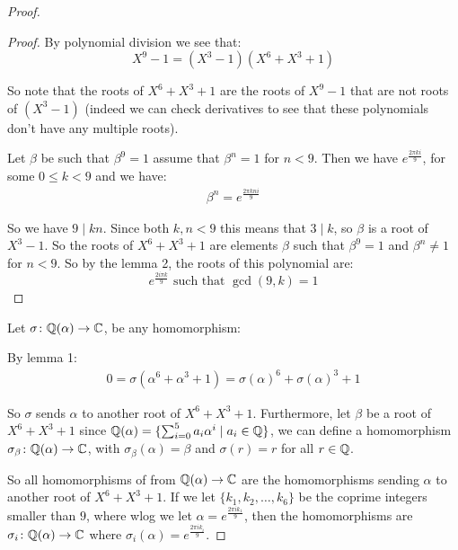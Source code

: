 \begin{exercise}
\begin{proof}
\begin{lemma}
        \begin{proof}
            By polynomial division we see that:\begin{equation}
                X^9 - 1 = (X^3-1)(X^6+X^3+1)
            \end{equation}
            
            So note that the roots of $X^6+X^3+1$ are the roots of $X^9-1$ that are not roots of $(X^3-1)$ (indeed we can check derivatives to see that these polynomials don't have any multiple roots).
            
            Let $\beta$ be such that $\beta^9 = 1$ assume that $\beta^n = 1$ for $n<9$. Then we have $e^{\frac{2\pi ki}{9}}$, for some $0\leq k<9$ and we have:\begin{align*}
                \beta^n = e^{\frac{2\pi kn i}{9}}
            \end{align*}

            So we have $9\mid kn$. Since both $k,n<9$ this means that $3\mid k$, so $\beta$ is a root of $X^3-1$. So the roots of $X^6+X^3+1$ are elements $\beta$ such that $\beta^9 = 1$ and $\beta^n\neq 1$ for $n<9$. So by the lemma 2, the roots of this polynomial are:\begin{equation}
                e^{\frac{2i\pi k}{9}} \text{ such that }\gcd(9,k) = 1
            \end{equation} 
        \end{proof}
    \end{lemma}
Let $\sigma\colon \mathbb{Q}(\alpha)\rightarrow \mathbb{C}$, be any homomorphism:

By lemma 1:\begin{align*}
    0 = \sigma(\alpha^6+\alpha^3+1) = {\sigma(\alpha)}^6+{\sigma(\alpha)}^3+1
\end{align*}

So $\sigma$ sends $\alpha$ to another root of $X^6+X^3+1$. Furthermore, let $\beta$ be a root of $X^6+X^3+1$ since $\mathbb{Q}(\alpha) = \{\sum_{i=0}^5 a_i\alpha^i \mid a_i\in \mathbb{Q}\}$, we can define a homomorphism $\sigma_\beta\colon \mathbb{Q}(\alpha)\rightarrow \mathbb{C}$, with $\sigma_\beta(\alpha) = \beta$ and $\sigma(r) = r$ for all $r\in \mathbb{Q}$. 

So all homomorphisms of from $\mathbb{Q}(\alpha)\rightarrow \mathbb{C}$ are the homomorphisms sending $\alpha$ to another root of $X^6+X^3+1$. If we let $\{k_1,k_2,\dots,k_6\}$ be the coprime integers smaller than $9$, where wlog we let $\alpha = e^{\frac{2\pi i k_1}{9}}$, then the homomorphisms are $\sigma_i \colon \mathbb{Q}(\alpha)\rightarrow \mathbb{C}$ where $\sigma_i(\alpha) = e^{\frac{2\pi i k_i}{9}}$.


\end{proof}
\end{exercise}

